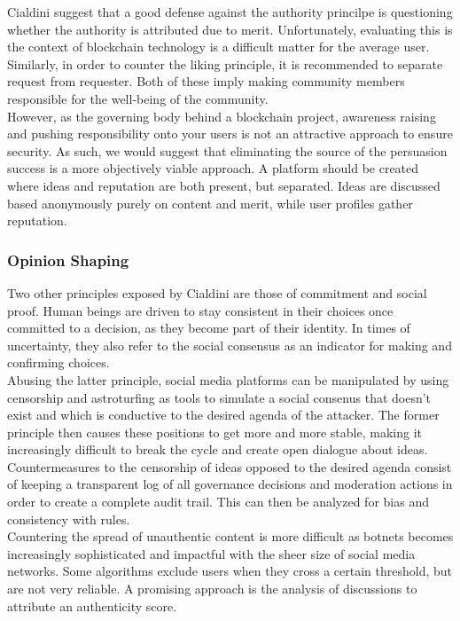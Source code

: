 \documentclass[12pt,a4paper]{article}
\begin{document}
Cialdini suggest that a good defense against the authority princilpe is questioning whether the authority is attributed due to merit. Unfortunately, evaluating this is the context of blockchain technology is a difficult matter for the average user. Similarly, in order to counter the liking principle, it is recommended to separate request from requester. Both of these imply making community members responsible for the well-being of the community.\\

However, as the governing body behind a blockchain project, awareness raising and pushing responsibility onto your users is not an attractive approach to ensure security. As such, we would suggest that eliminating the source of the persuasion success is a more objectively viable approach. A platform should be created where ideas and reputation are both present, but separated. Ideas are discussed based anonymously purely on content and merit, while user profiles gather reputation.\\

\subsubsection{Opinion Shaping}

Two other principles exposed by Cialdini are those of commitment and social proof. Human beings are driven to stay consistent in their choices once committed to a decision, as they become part of their identity. In times of uncertainty, they also refer to the social consensus as an indicator for making and confirming choices.\\

Abusing the latter principle, social media platforms can be manipulated by using censorship and astroturfing \cite{astroturf} as tools to simulate a social consenus that doesn't exist and which is conductive to the desired agenda of the attacker. The former principle then causes these positions to get more and more stable, making it increasingly difficult to break the cycle and create open dialogue about ideas.\\

Countermeasures to the censorship of ideas opposed to the desired agenda consist of keeping a transparent log of all governance decisions and moderation actions in order to create a complete audit trail. This can then be analyzed for bias and consistency with rules.\\

Countering the spread of unauthentic content is more difficult as botnets becomes increasingly sophisticated and impactful with the sheer size of social media networks. Some algorithms exclude users when they cross a certain threshold, but are not very reliable. A promising approach is the analysis of discussions to attribute an authenticity score.\\
\end{document}
